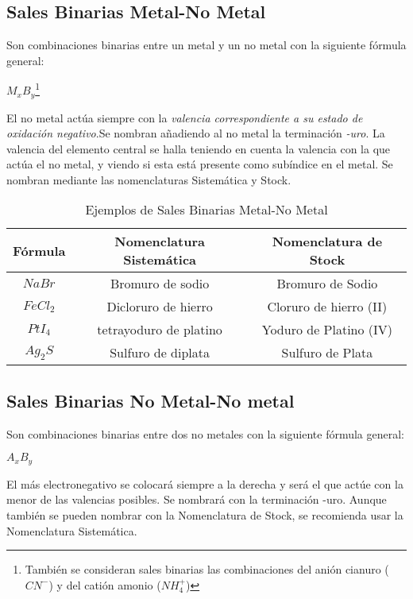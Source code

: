\subsection{Sales Binarias Metal-No Metal}
Son combinaciones binarias entre un metal y un no metal con la siguiente fórmula general:\\
\begin{center}
$M_{x}B_y$\footnote{También se consideran sales binarias las combinaciones del anión cianuro ($CN^{-}$) y del catión amonio ($NH^{+}_4$)}
\end{center}
El no metal actúa siempre con la \emph{valencia correspondiente a su estado de oxidación negativo}.Se nombran añadiendo al no metal la terminación \emph{-uro}. La valencia del elemento central se halla teniendo en cuenta la valencia con la que actúa el no metal, y viendo si esta está presente como subíndice en el metal. Se nombran mediante las nomenclaturas Sistemática y Stock.
\begin{table}[h!]
	\centering
	\begin{tabular}{c|cc}
		Fórmula&Nomenclatura Sistemática&Nomenclatura de Stock\\ \hline
		$NaBr$&Bromuro de sodio&Bromuro de Sodio\\ 
		$FeCl_{2}$&Dicloruro de hierro&Cloruro de hierro (II)\\
		$PtI_{4}$&tetrayoduro de platino&Yoduro de Platino (IV)\\
		$Ag_{2}S$&Sulfuro de diplata&Sulfuro de Plata\\ \hline
	\end{tabular}
	\caption{Ejemplos de Sales Binarias Metal-No Metal}
\end{table}
\subsection{Sales Binarias No Metal-No metal}
Son combinaciones binarias entre dos no metales con la siguiente fórmula general:\\
\begin{center}
	$A_{x}B_y$
\end{center}
El más electronegativo se colocará siempre a la derecha y será el que actúe con la menor de las valencias posibles. Se nombrará con la terminación -uro. Aunque también se pueden nombrar con la Nomenclatura de Stock, se recomienda usar la Nomenclatura Sistemática. 


